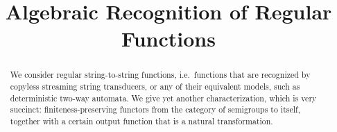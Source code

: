 \documentclass[a4paper,UKenglish,cleveref,autoref,thm-restate,numberwithinsect]{lipics-v2021}
\title{Algebraic Recognition of Regular Functions} %
\begin{document}
\maketitle

\begin{abstract}
    We consider regular string-to-string functions, i.e.~functions that are recognized by copyless streaming string transducers, or  any of their equivalent models, such as deterministic two-way automata. We give yet another characterization, which is very succinct: finiteness-preserving functors from the category of semigroups to itself, together with a certain output function that is a natural transformation.
\end{abstract}

\newcommand{\moncat}{\mathrm{Mon}}
\newcommand{\semcat}{\mathrm{Sem}}











\appendix

\newpage




\end{document}
